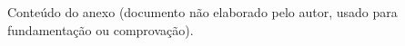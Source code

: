 \label{ane:a}

Conte\'udo do anexo (documento n\~ao elaborado pelo autor, usado para
fundamenta\c{c}\~ao ou comprova\c{c}\~ao).
